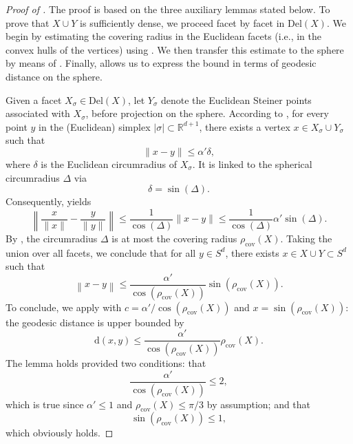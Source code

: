 \documentclass[10pt,a4paper]{amsart}
\newcommand{\Del}[1] { \mathrm{Del}(#1) } %
\newcommand{\R}{\mathbb R}
\renewcommand{\d} { \mathrm{d} } %
\newcommand{\geomreal}[1] { |#1| } %
\begin{document}
\begin{proof}[Proof of ]
	\label{proof:decreasecoveringradius}
	The proof is based on the three auxiliary lemmas stated below.
	To prove that $X\cup Y$ is sufficiently dense, we proceed facet by facet in $\Del{X}$.
	We begin by estimating the covering radius in the Euclidean facets (i.e., in the convex hulls of the vertices) using .
	We then transfer this estimate to the sphere by means of .
	Finally,  allows us to express the bound in terms of geodesic distance on the sphere.
	
	Given a facet $X_\sigma\in\Del{X}$, let $Y_\sigma$ denote the Euclidean Steiner points associated with $X_\sigma$, before projection on the sphere.
	According to , for every point $y$ in the (Euclidean) simplex $\geomreal{\sigma}\subset\R^{d+1}$, there exists a vertex $x\in X_\sigma\cup Y_\sigma$ such that
	\[
	\|x-y\| \leq \alpha' \delta,
	\]
	where $\delta$ is the Euclidean circumradius of $X_\sigma$.
	It is linked to the spherical circumradius $\Delta$ via
	\[
	\delta = \sin(\Delta).
	\]
	Consequently,  yields
	\[
	\left\|\frac{x}{\|x\|}-\frac{y}{\|y\|} \right\|
	\leq
	\frac{1}{\cos(\Delta)} \|x-y\|
	\leq
	\frac{1}{\cos(\Delta)} \alpha'\sin(\Delta).
	\]
	By , the circumradius $\Delta$ is at most the covering radius $\rho_\mathrm{cov}(X)$.
	Taking the union over all facets, we conclude that for all $y\in S^d$, there exists $x\in X\cup Y\subset S^d$ such that
	\[
	\left\| x-y\right\|
	\leq
	\frac{\alpha'}{\cos(\rho_\mathrm{cov}(X))} \sin(\rho_\mathrm{cov}(X)).
	\]
	To conclude, we apply  with $c=\alpha'/\cos(\rho_\mathrm{cov}(X))$ and $x=\sin(\rho_\mathrm{cov}(X))$: the geodesic distance is upper bounded by
	\[
	\d(x,y)
	\leq
	\frac{\alpha'}{\cos(\rho_\mathrm{cov}(X))} \rho_\mathrm{cov}(X).
	\]
	The lemma holds provided two conditions: that 
	\[
	\frac{\alpha'}{\cos(\rho_\mathrm{cov}(X))}\leq2,
	\] 
	which is true since $\alpha'\leq 1$ and $\rho_\mathrm{cov}(X)\leq \pi/3$ by assumption; and that 
	\[
	\sin(\rho_\mathrm{cov}(X))\leq1,
	\]
	which obviously holds.
\end{proof}
\end{document}
